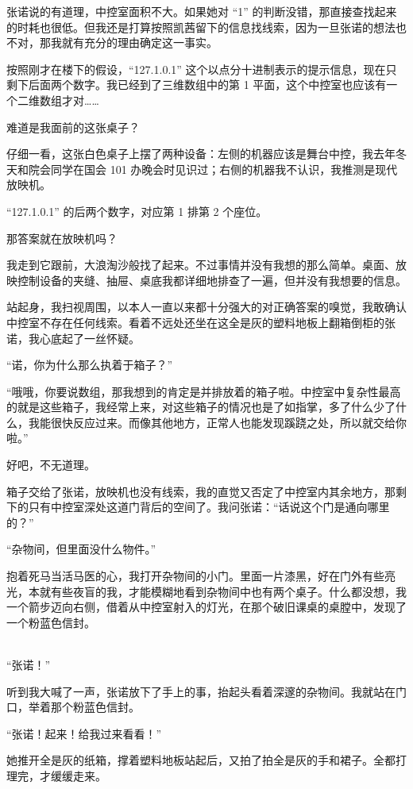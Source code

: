 \documentclass[UTF8]{ctexart}
\begin{document}
张诺说的有道理，中控室面积不大。如果她对 “1” 的判断没错，那直接查找起来的时耗也很低。但我还是打算按照凯茜留下的信息找线索，因为一旦张诺的想法也不对，那我就有充分的理由确定这一事实。

按照刚才在楼下的假设，“127.1.0.1” 这个以点分十进制表示的提示信息，现在只剩下后面两个数字。我已经到了三维数组中的第 1 平面，这个中控室也应该有一个二维数组才对……

难道是我面前的这张桌子？

仔细一看，这张白色桌子上摆了两种设备：左侧的机器应该是舞台中控，我去年冬天和院会同学在国会 101 办晚会时见识过；右侧的机器我不认识，我推测是现代放映机。

“127.1.0.1” 的后两个数字，对应第 1 排第 2 个座位。

那答案就在放映机吗？

我走到它跟前，大浪淘沙般找了起来。不过事情并没有我想的那么简单。桌面、放映控制设备的夹缝、抽屉、桌底我都详细地排查了一遍，但并没有我想要的信息。

站起身，我扫视周围，以本人一直以来都十分强大的对正确答案的嗅觉，我敢确认中控室不存在任何线索。看着不远处还坐在这全是灰的塑料地板上翻箱倒柜的张诺，我心底起了一丝怀疑。

“诺，你为什么那么执着于箱子？”

“哦哦，你要说数组，那我想到的肯定是并排放着的箱子啦。中控室中复杂性最高的就是这些箱子，我经常上来，对这些箱子的情况也是了如指掌，多了什么少了什么，我能很快反应过来。而像其他地方，正常人也能发现蹊跷之处，所以就交给你啦。”

好吧，不无道理。

箱子交给了张诺，放映机也没有线索，我的直觉又否定了中控室内其余地方，那剩下的只有中控室深处这道门背后的空间了。我问张诺：“话说这个门是通向哪里的？”

“杂物间，但里面没什么物件。”

抱着死马当活马医的心，我打开杂物间的小门。里面一片漆黑，好在门外有些亮光，本就有些夜盲的我，才能模糊地看到杂物间中也有两个桌子。什么都没想，我一个箭步迈向右侧，借着从中控室射入的灯光，在那个破旧课桌的桌膛中，发现了一个粉蓝色信封。

~\\

“张诺！”

听到我大喊了一声，张诺放下了手上的事，抬起头看着深邃的杂物间。我就站在门口，举着那个粉蓝色信封。

“张诺！起来！给我过来看看！”

她推开全是灰的纸箱，撑着塑料地板站起后，又拍了拍全是灰的手和裙子。全都打理完，才缓缓走来。
\end{document}
